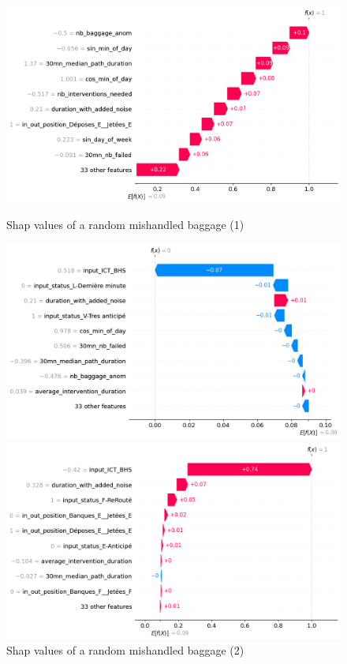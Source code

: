 \documentclass[12pt]{article}
\begin{document}
\begin{figure}
\begin{minipage}[c]{0.5\linewidth}
    \includegraphics[width=1\textwidth]{shap values 1.png}
    \caption{Shap values of a random mishandled baggage (1)}
    \label{fig:Shap values of a random mishandled baggage (1)}
\end{minipage}
\hfill
\begin{minipage}[c]{0.5\linewidth}
    \includegraphics[width=1\textwidth]{shap values 2.png}
    \caption{Shap values of a random mishandled baggage (2)}
    \label{fig:Shap values of a random mishandled baggage (2)}
\end{minipage}
\break
\begin{minipage}[c]{0.5\linewidth}
    \includegraphics[width=1\textwidth]{shap values 3.png}

\end{minipage}
\end{figure}
\end{document}
